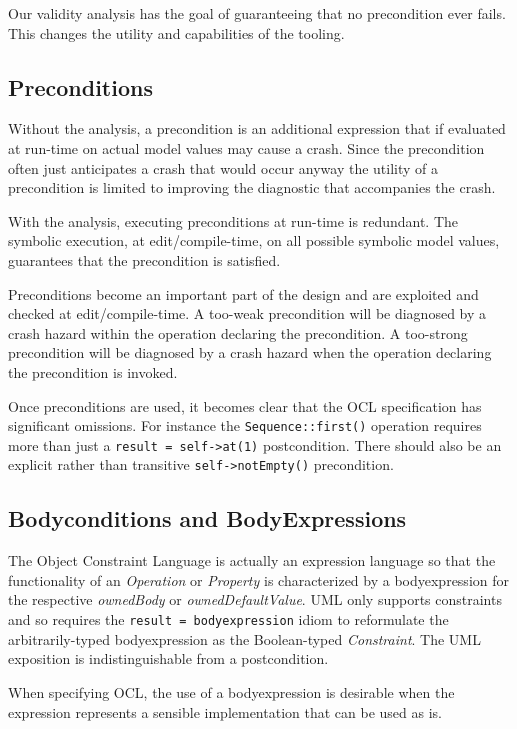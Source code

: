 \documentclass{llncs}
\begin{document}
Our validity analysis has the goal of guaranteeing that no precondition ever fails. This changes the utility and capabilities of the tooling.

\subsection{Preconditions}

Without the analysis, a precondition is an additional expression that if evaluated at run-time on actual model values may cause a crash. Since the precondition often just anticipates a crash that would occur anyway the utility of a precondition is limited to improving the diagnostic that accompanies the crash.

With the analysis, executing preconditions at run-time is redundant. The symbolic execution, at edit/compile-time, on all possible symbolic model values, guarantees that the precondition is satisfied.

Preconditions become an important part of the design and are exploited and checked at edit/compile-time. A too-weak precondition will be diagnosed by a crash hazard within the operation declaring the precondition. A too-strong precondition will be diagnosed by a crash hazard when the operation declaring the precondition is invoked.

Once preconditions are used, it becomes clear that the OCL specification has significant omissions.  For instance the \verb|Sequence::first()| operation requires more than just a \verb|result = self->at(1)| postcondition. There should also be an explicit rather than transitive \verb|self->notEmpty()| precondition.

\subsection{Bodyconditions and BodyExpressions}

The Object Constraint Language is actually an expression language so that the functionality of an \emph{Operation} or \emph{Property} is characterized by a bodyexpression for the respective \emph{ownedBody} or \emph{ownedDefaultValue}. UML only supports constraints and so requires the \verb|result = bodyexpression| idiom to reformulate the arbitrarily-typed bodyexpression as the Boolean-typed \emph{Constraint}. The UML exposition is indistinguishable from a postcondition.

When specifying OCL, the use of a bodyexpression is desirable when the expression represents a sensible implementation that can be used as is.
\end{document}
